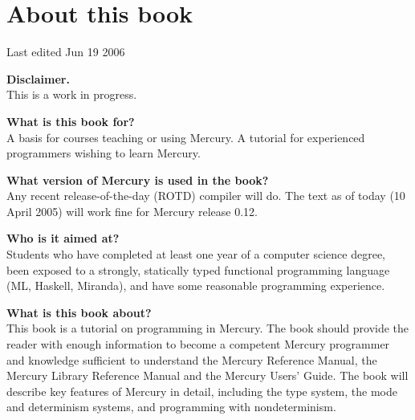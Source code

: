 \documentclass[a4paper,11pt,notitlepage,onecolumn]{book}
\begin{document}
% 

\newcommand{\polytexopenbrace}%
{\{}
\newcommand{\polytexclosebrace}%
{\}}
\newcommand{\polytexampersand}%
{\&}

\setcounter{chapter}{-1}



\chapter{About this book}

Last edited Jun 19 2006

\textbf{Disclaimer.}
\\
This is a work in progress.

\textbf{What is this book for?}
\\
A basis for courses teaching or using Mercury.  A tutorial for
experienced programmers wishing to learn Mercury.

\textbf{What version of Mercury is used in the book?}
\\
Any recent release-of-the-day (ROTD) compiler will do.  The text as of today
(10 April 2005) will work fine for Mercury release 0.12.

\textbf{Who is it aimed at?}
\\
Students who have completed at least one year of a computer science
degree, been exposed to a strongly, statically typed functional programming
language (\eg ML, Haskell, Miranda), and have some reasonable programming
experience.

\textbf{What is this book about?}
\\
This book is a tutorial on programming in Mercury.  The book should
provide the reader with enough information to become a competent Mercury
programmer and knowledge sufficient to understand the Mercury Reference
Manual, the Mercury Library Reference Manual and the Mercury Users' Guide.
The book will describe key features of Mercury in detail, including the type
system, the mode and determinism systems, and programming with
nondeterminism.
\end{document}
